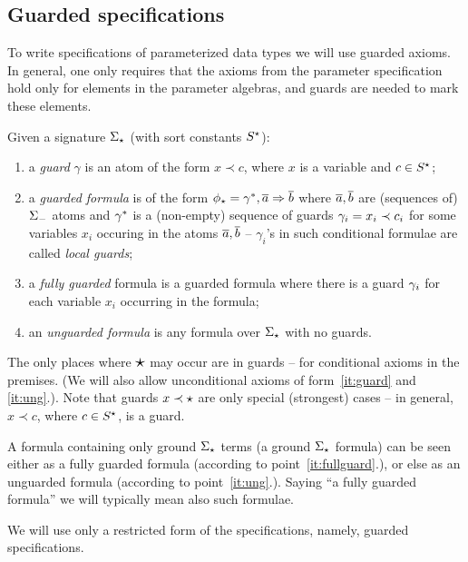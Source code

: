 \subsection{Guarded specifications}
To write specifications of parameterized data types we will use guarded
axioms. In general, one only requires that the axioms from the parameter specification
hold only for elements in the parameter algebras, and guards are needed to mark these elements.

\begin{definition}\label{def:guf}
Given a signature  $\Sigma_\star$ (with sort constants $S^\star$):
\begin{enumerate}\MyLPar
\item\label{it:guard} a {\em guard} $\gamma$ is an atom of the form $x \prec c$, where
$x$ is a variable and $c \in S^\star$;
\item a {\em guarded formula} is of the form $\phi_\star = \gamma^{\ast},
	\overline{a} \Rightarrow \overline{b}$ where $\overline{a},\overline{b}$ are (sequences of)
	${\Sigma_-}$ atoms and 
	$\gamma^\ast$ is a (non-empty) sequence of guards $\gamma_i =
	x_i\prec {c_{i}}$ for some variables $x_i$ occuring in the
	atoms $\overline{a},\overline{b}$ -- $\gamma_i$'s in such conditional
	formulae are called {\em local guards};
\item\label{it:fullguard} a {\em fully guarded} formula is a guarded formula where there is a
guard $\gamma_i$ for each variable $x_i$ occurring in the formula;
\item\label{it:ung} an {\em unguarded formula} is any formula over $\Sigma_\star$
with no guards.
\end{enumerate}
\end{definition}
The only places where $\mbox{\Large{$\star$}}$ may occur are in guards
-- for conditional axioms in the premises. (We will also allow unconditional
axioms of form~\ref{it:guard} and \ref{it:ung}.). Note that guards $x\prec\star$ are only special
(strongest) cases -- in general, $x\prec c$, where $c\in S^\star$, is a
guard. 

A formula containing only ground $\Sigma_\star$ terms (a ground
$\Sigma_\star$ formula) can be seen either as a fully guarded formula
(according to point~\ref{it:fullguard}.), or else as an unguarded formula
(according to point~\ref{it:ung}.). Saying ``a fully guarded formula'' we
will typically mean also such formulae.

We will use only a restricted form of the specifications, namely, 
guarded  specifications.

